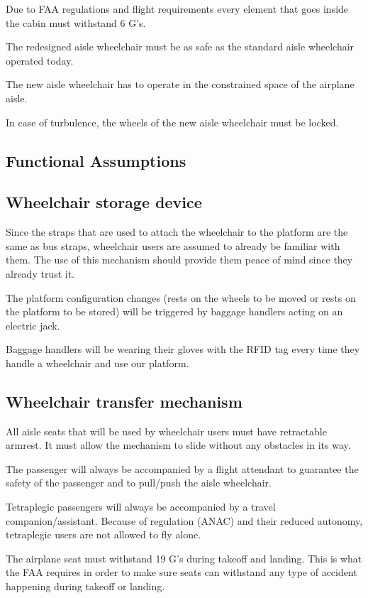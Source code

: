 \begin{list}{-}{}
  \item Due to FAA regulations and flight requirements every element that goes inside the cabin must withstand 6 G's.
  \item The redesigned aisle wheelchair must be as safe as the standard aisle wheelchair operated today.
  \item The new aisle wheelchair has to operate in the constrained space of the airplane aisle.
  \item In case of turbulence, the wheels of the new aisle wheelchair must be locked.
\end{list}

\subsection{Functional Assumptions}

\subsection*{Wheelchair storage device}

\begin{list}{-}{}
  \item Since the straps that are used to attach the wheelchair to the platform are the same as bus straps, wheelchair users are assumed to already be familiar with them. The use of this mechanism should provide them peace of mind since they already trust it. 
  \item The platform configuration changes (rests on the wheels to be moved or rests on the platform to be stored) will be triggered by baggage handlers acting on an electric jack.
  \item Baggage handlers will be wearing their gloves with the RFID tag every time  they handle a wheelchair and use our platform.
\end{list}

\subsection*{Wheelchair transfer mechanism}

\begin{list}{-}{}
  \item All aisle seats  that will be used by wheelchair users must have retractable armrest. It must allow the mechanism to slide without any obstacles in its way.
  \item The passenger will always be accompanied by a flight attendant to guarantee the safety of the passenger and to pull/push the aisle wheelchair.
  \item Tetraplegic passengers will always be accompanied by a travel companion/assistant. Because of regulation (ANAC) and their reduced autonomy, tetraplegic users are not allowed to fly alone.
  \item The airplane seat must withstand 19 G's during takeoff and landing. This is what the FAA requires in order to make sure seats can withstand any type of accident happening during takeoff or landing.
\end{list}

